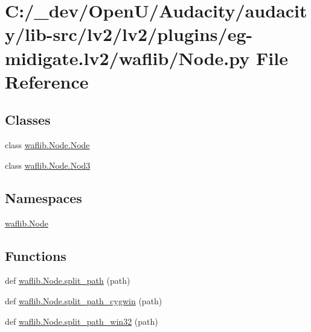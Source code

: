 \hypertarget{lv2_2plugins_2eg-midigate_8lv2_2waflib_2_node_8py}{}\section{C\+:/\+\_\+dev/\+Open\+U/\+Audacity/audacity/lib-\/src/lv2/lv2/plugins/eg-\/midigate.lv2/waflib/\+Node.py File Reference}
\label{lv2_2plugins_2eg-midigate_8lv2_2waflib_2_node_8py}
\subsection*{Classes}
\begin{DoxyCompactItemize}
\item 
class \hyperlink{classwaflib_1_1_node_1_1_node}{waflib.\+Node.\+Node}
\item 
class \hyperlink{classwaflib_1_1_node_1_1_nod3}{waflib.\+Node.\+Nod3}
\end{DoxyCompactItemize}
\subsection*{Namespaces}
\begin{DoxyCompactItemize}
\item 
 \hyperlink{namespacewaflib_1_1_node}{waflib.\+Node}
\end{DoxyCompactItemize}
\subsection*{Functions}
\begin{DoxyCompactItemize}
\item 
def \hyperlink{namespacewaflib_1_1_node_ae580a314d04691a283552a4712b56a84}{waflib.\+Node.\+split\+\_\+path} (path)
\item 
def \hyperlink{namespacewaflib_1_1_node_a089fc378e3863231aab10b6892a9bc2b}{waflib.\+Node.\+split\+\_\+path\+\_\+cygwin} (path)
\item 
def \hyperlink{namespacewaflib_1_1_node_a20acd7540bbb7886232accfe0a2a4219}{waflib.\+Node.\+split\+\_\+path\+\_\+win32} (path)
\end{DoxyCompactItemize}
